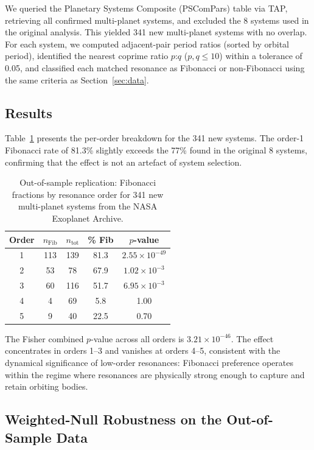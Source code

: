\documentclass[twocolumn,11pt]{article}
\begin{document}
We queried the Planetary Systems Composite (PSComPars) table via TAP,
retrieving all confirmed multi-planet systems, and excluded the 8
systems used in the original analysis.  This yielded 341 new
multi-planet systems with no overlap.  For each system, we computed
adjacent-pair period ratios (sorted by orbital period), identified the
nearest coprime ratio $p$:$q$ ($p,q \leq 10$) within a tolerance of
0.05, and classified each matched resonance as Fibonacci or
non-Fibonacci using the same criteria as Section~\ref{sec:data}.

\subsection{Results}

Table~\ref{tab:replication} presents the per-order breakdown for the
341 new systems.  The order-1 Fibonacci rate of 81.3\% slightly
exceeds the 77\% found in the original 8 systems, confirming that the
effect is not an artefact of system selection.

\begin{table}[h]
\centering
\caption{Out-of-sample replication: Fibonacci fractions by resonance
order for 341 new multi-planet systems from the NASA Exoplanet Archive.}
\label{tab:replication}
\begin{tabular}{ccccc}
\toprule
Order & $n_\mathrm{Fib}$ & $n_\mathrm{tot}$ & \% Fib & $p$-value \\
\midrule
1 & 113 & 139 & 81.3 & $2.55 \times 10^{-49}$ \\
2 & 53 & 78 & 67.9 & $1.02 \times 10^{-3}$ \\
3 & 60 & 116 & 51.7 & $6.95 \times 10^{-3}$ \\
4 & 4 & 69 & 5.8 & 1.00 \\
5 & 9 & 40 & 22.5 & 0.70 \\
\bottomrule
\end{tabular}
\end{table}

The Fisher combined $p$-value across all orders is $3.21 \times
10^{-46}$.  The effect concentrates in orders 1--3 and vanishes at
orders 4--5, consistent with the dynamical significance of low-order
resonances: Fibonacci preference operates within the regime where
resonances are physically strong enough to capture and retain orbiting
bodies.

\subsection{Weighted-Null Robustness on the Out-of-Sample Data}
\label{sec:oos_weighted_null}
\end{document}
